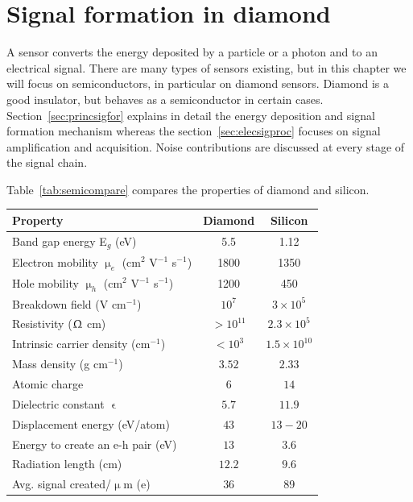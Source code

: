 \documentclass[12pt]{mytustyle}  %
\begin{document}
\baselineskip=15pt
\newcommand{\ga}{\greektext a\latintext}
\newcommand{\gmu}{\greektext m\latintext}

\chapter{Signal formation in diamond}
A sensor converts the energy deposited by a particle or a photon and to an electrical signal. There are many types of sensors existing, but in this chapter we will focus on semiconductors, in particular on diamond sensors. Diamond is a good insulator, but behaves as a semiconductor in certain cases. Section~\ref{sec:princsigfor} explains in detail the energy deposition and signal formation mechanism whereas the section~\ref{sec:elecsigproc} focuses on signal amplification and acquisition. Noise contributions are discussed at every stage of the signal chain.


Table~\ref{tab:semicompare} compares the properties of diamond and silicon. 

\begin{footnotesize}
\begin{center}
\begin{tabular}{   l  c  c   }
\hline
Property & Diamond & Silicon \\
\hline
Band gap energy E$_g$ (eV) & 5.5 & 1.12  \\
Electron mobility $\upmu_e$ (cm$^2$ V$^{-1}$ s$^{-1}$) & 1800 & 1350 \\
Hole mobility $\upmu_h$ (cm$^2$ V$^{-1}$ s$^{-1}$) & 1200 & 450 \\
Breakdown field (V cm$^{-1}$) & $10^{7}$ & $3\times 10^5$ \\
Resistivity ($\Upomega$ cm) & $>10^{11}$  & $2.3\times 10^5$  \\
Intrinsic carrier density (cm$^{-1}$) & $<10^3$ & $1.5\times 10^{10} $ \\
Mass density (g cm$^{-1}$) & $ 3.52$ & $2.33 $ \\
Atomic charge  & $6 $ & $ 14$ \\
Dielectric constant $\upvarepsilon$ & $5.7 $ & $11.9 $ \\
Displacement energy (eV/atom) & $43 $ & $13-20 $ \\
Energy to create an e-h pair  (eV) & $13 $ & $ 3.6$ \\
Radiation length (cm) & $ 12.2$ & $9.6 $ \\
Avg. signal created/$\upmu$m (e) & 36 & 89 \\\hline
\end{tabular}
\label{tab:semicompare}
\end{center}
\end{footnotesize}
\end{document}
